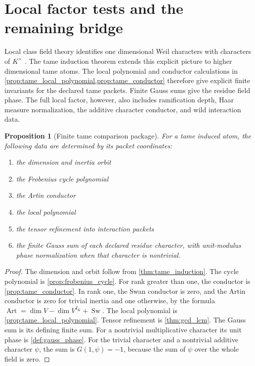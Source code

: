 \documentclass[11pt]{amsart}
\newtheorem{proposition}[proposition]{Proposition}
\theoremstyle{definition}
\theoremstyle{remark}
\begin{document}
\section{Local factor tests and the remaining bridge}\label{sec:boundary}

Local class field theory identifies one dimensional Weil characters with characters of \(K^{\times}\) \cite{Serre1967,Tate1979}. The tame induction theorem extends this explicit picture to higher dimensional tame atoms. The local polynomial and conductor calculations in \cref{prop:tame_local_polynomial,prop:tame_conductor} therefore give explicit finite invariants for the declared tame packets. Finite Gauss sums give the residue field phase. The full local factor, however, also includes ramification depth, Haar measure normalization, the additive character conductor, and wild interaction data.

\begin{proposition}[Finite tame comparison package]\label{prop:tame_package}
For a tame induced atom, the following data are determined by its packet coordinates:

\begin{enumerate}
\item the dimension and inertia orbit
\item the Frobenius cycle polynomial
\item the Artin conductor
\item the local polynomial
\item the tensor refinement into interaction packets
\item the finite Gauss sum of each declared residue character, with unit-modulus phase normalization when that character is nontrivial.
\end{enumerate}
\end{proposition}

\begin{proof}
The dimension and orbit follow from \cref{thm:tame_induction}. The cycle polynomial is \cref{prop:frobenius_cycle}. For rank greater than one, the conductor is \cref{prop:tame_conductor}. In rank one, the Swan conductor is zero, and the Artin conductor is zero for trivial inertia and one otherwise, by the formula \(\operatorname{Art}=\dim V-\dim V^{I_K}+\operatorname{Sw}\). The local polynomial is \cref{prop:tame_local_polynomial}. Tensor refinement is \cref{thm:gcd_lcm}. The Gauss sum is its defining finite sum. For a nontrivial multiplicative character its unit phase is \cref{def:gauss_phase}. For the trivial character and a nontrivial additive character \(\psi\), the sum is \(G(1,\psi)=-1\), because the sum of \(\psi\) over the whole field is zero.
\end{proof}
\end{document}
